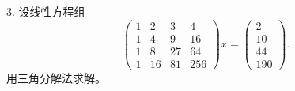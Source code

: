 \documentclass[11pt, a4paper]{ctexart}
\begin{document}
\begin{problem}{3. 设线性方程组}
    \[
        \begin{pmatrix}
            1 & 2 & 3 & 4 \\
            1 & 4 & 9 & 16 \\
            1 & 8 & 27 & 64 \\
            1 & 16 & 81 & 256
        \end{pmatrix}
        x
        =
        \begin{pmatrix}
            2 \\
            10 \\
            44 \\
            190
        \end{pmatrix}.
    \]
    用三角分解法求解。
\end{problem}
\end{document}
